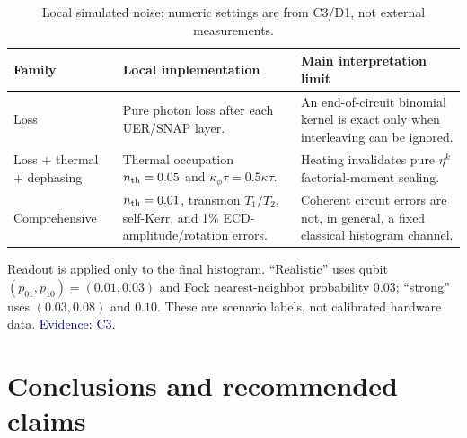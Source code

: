 \documentclass[10pt]{article}
\newcommand{\evidence}[1]{\textcolor{navy}{\footnotesize\textsf{Evidence: #1}}}
\begin{document}
\begin{table}[h]
\centering\small
\begin{tabularx}{\textwidth}{@{}p{}YY@{}}
\toprule
Family & Local implementation & Main interpretation limit\\
\midrule
Loss & Pure photon loss after each UER/SNAP layer. & An end-of-circuit binomial kernel is exact only
when interleaving can be ignored.\\
Loss + thermal + dephasing & Thermal occupation $n_{\rm th}=0.05$ and
$\kappa_\phi\tau=0.5\kappa\tau$. & Heating invalidates pure $\eta^k$ factorial-moment scaling.\\
Comprehensive & $n_{\rm th}=0.01$, transmon $T_1/T_2$, self-Kerr, and 1\% ECD-amplitude/rotation
errors. & Coherent circuit errors are not, in general, a fixed classical histogram channel.\\
\bottomrule
\end{tabularx}
\caption{Local simulated noise; numeric settings are from C3/D1, not external measurements.}
\end{table}

Readout is applied only to the final histogram. ``Realistic'' uses qubit
$(p_{01},p_{10})=(0.01,0.03)$ and Fock nearest-neighbor probability $0.03$; ``strong'' uses
$(0.03,0.08)$ and $0.10$. These are scenario labels, not calibrated hardware data.
\evidence{C3.}

\section{Conclusions and recommended claims}
\end{document}
